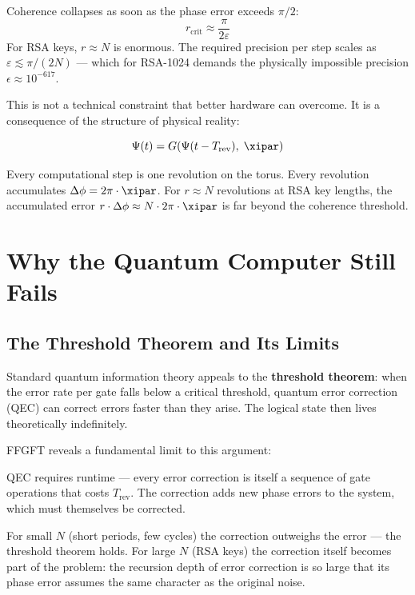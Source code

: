 Coherence collapses as soon as the phase error exceeds $\pi/2$:
\begin{equation}
    r_\text{crit} \approx \frac{\pi}{2\varepsilon}
\end{equation}
For RSA keys, $r \approx N$ is enormous. The required precision per step scales as
$\varepsilon \lesssim \pi/(2N)$ — which for RSA-1024 demands the physically
impossible precision $\epsilon \approx 10^{-617}$.

\begin{foundation}
This is not a technical constraint that better hardware can overcome.
It is a consequence of the structure of physical reality:

\begin{equation}
    \Psi(t) = G\!\left(\Psi(t - T_\text{rev}),\; \xipar\right)
\end{equation}

Every computational step is one revolution on the torus. Every revolution
accumulates $\Delta\phi = 2\pi \cdot \xipar$. For $r \approx N$ revolutions
at RSA key lengths, the accumulated error $r \cdot \Delta\phi \approx N \cdot
2\pi \cdot \xipar$ is far beyond the coherence threshold.
\end{foundation}


\section{Why the Quantum Computer Still Fails}

\subsection{The Threshold Theorem and Its Limits}

Standard quantum information theory appeals to the \textbf{threshold theorem}:
when the error rate per gate falls below a critical threshold, quantum error
correction (QEC) can correct errors faster than they arise. The logical state
then lives theoretically indefinitely.

FFGFT reveals a fundamental limit to this argument:

\begin{important}
QEC requires runtime — every error correction is itself a sequence of gate
operations that costs $T_\text{rev}$. The correction adds new phase errors
to the system, which must themselves be corrected.

For small $N$ (short periods, few cycles) the correction outweighs the error
— the threshold theorem holds. For large $N$ (RSA keys) the correction itself
becomes part of the problem: the recursion depth of error correction is so
large that its phase error assumes the same character as the original noise.
\end{important}

